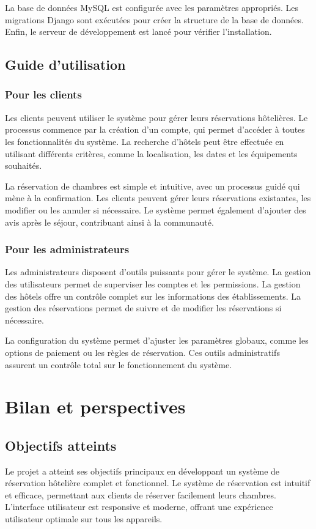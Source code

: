 \documentclass[12pt,a4paper]{report}
\begin{document}
La base de données MySQL est configurée avec les paramètres appropriés. Les migrations Django sont exécutées pour créer la structure de la base de données. Enfin, le serveur de développement est lancé pour vérifier l'installation.

\section{Guide d'utilisation}
\subsection{Pour les clients}
Les clients peuvent utiliser le système pour gérer leurs réservations hôtelières. Le processus commence par la création d'un compte, qui permet d'accéder à toutes les fonctionnalités du système. La recherche d'hôtels peut être effectuée en utilisant différents critères, comme la localisation, les dates et les équipements souhaités.

La réservation de chambres est simple et intuitive, avec un processus guidé qui mène à la confirmation. Les clients peuvent gérer leurs réservations existantes, les modifier ou les annuler si nécessaire. Le système permet également d'ajouter des avis après le séjour, contribuant ainsi à la communauté.

\subsection{Pour les administrateurs}
Les administrateurs disposent d'outils puissants pour gérer le système. La gestion des utilisateurs permet de superviser les comptes et les permissions. La gestion des hôtels offre un contrôle complet sur les informations des établissements. La gestion des réservations permet de suivre et de modifier les réservations si nécessaire.

La configuration du système permet d'ajuster les paramètres globaux, comme les options de paiement ou les règles de réservation. Ces outils administratifs assurent un contrôle total sur le fonctionnement du système.

\chapter{Bilan et perspectives}
\section{Objectifs atteints}
Le projet a atteint ses objectifs principaux en développant un système de réservation hôtelière complet et fonctionnel. Le système de réservation est intuitif et efficace, permettant aux clients de réserver facilement leurs chambres. L'interface utilisateur est responsive et moderne, offrant une expérience utilisateur optimale sur tous les appareils.
\end{document}

